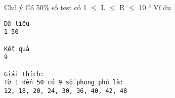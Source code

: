 Chú ý
Có 50\% số test có 1  $\le$  L  $\le$  R  $\le$  10   $^    3   $
Ví dụ
\begin{verbatim}
Dữ liệu
1 50

Kết quả
9

Giải thích:
Từ 1 đến 50 có 9 số phong phú là: 
12, 18, 20, 24, 30, 36, 40, 42, 48
\end{verbatim}